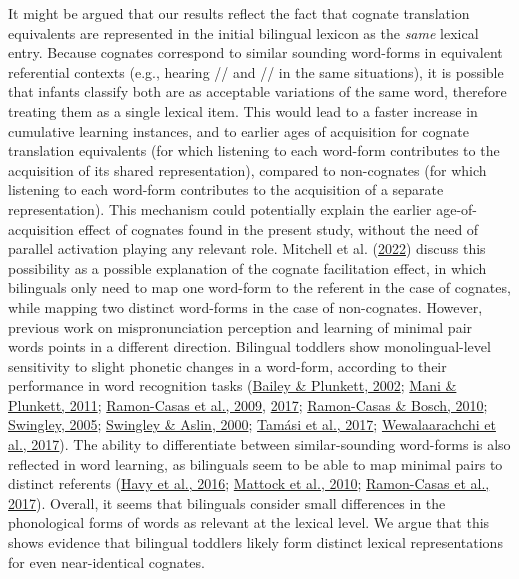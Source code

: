 \documentclass[
]{article}
\begin{document}
It might be argued that our results reflect the fact that cognate
translation equivalents are represented in the initial bilingual lexicon
as the \emph{same} lexical entry. Because cognates correspond to similar
sounding word-forms in equivalent referential contexts (e.g., hearing
// and // in the same situations), it is
possible that infants classify both are as acceptable variations of the
same word, therefore treating them as a single lexical item. This would
lead to a faster increase in cumulative learning instances, and to
earlier ages of acquisition for cognate translation equivalents (for
which listening to each word-form contributes to the acquisition of its
shared representation), compared to non-cognates (for which listening to
each word-form contributes to the acquisition of a separate
representation). This mechanism could potentially explain the earlier
age-of-acquisition effect of cognates found in the present study,
without the need of parallel activation playing any relevant role.
Mitchell et al. (\protect\hyperlink{ref-mitchell2022cognates}{2022})
discuss this possibility as a possible explanation of the cognate
facilitation effect, in which bilinguals only need to map one word-form
to the referent in the case of cognates, while mapping two distinct
word-forms in the case of non-cognates. However, previous work on
mispronunciation perception and learning of minimal pair words points in
a different direction. Bilingual toddlers show monolingual-level
sensitivity to slight phonetic changes in a word-form, according to
their performance in word recognition tasks
(\protect\hyperlink{ref-bailey2002phonological}{Bailey \& Plunkett,
2002}; \protect\hyperlink{ref-mani2011does}{Mani \& Plunkett, 2011};
\protect\hyperlink{ref-ramon-casas2009vowel}{Ramon-Casas et al., 2009},
\protect\hyperlink{ref-ramon-casas2017minimalpair}{2017};
\protect\hyperlink{ref-ramon-casas2010are}{Ramon-Casas \& Bosch, 2010};
\protect\hyperlink{ref-swingley200511montholds}{Swingley, 2005};
\protect\hyperlink{ref-swingley2000spoken}{Swingley \& Aslin, 2000};
\protect\hyperlink{ref-tamasi2017pupillometry}{Tamási et al., 2017};
\protect\hyperlink{ref-wewalaarachchi2017vowels}{Wewalaarachchi et al.,
2017}). The ability to differentiate between similar-sounding word-forms
is also reflected in word learning, as bilinguals seem to be able to map
minimal pairs to distinct referents
(\protect\hyperlink{ref-havy2016phonetic}{Havy et al., 2016};
\protect\hyperlink{ref-mattock2010first}{Mattock et al., 2010};
\protect\hyperlink{ref-ramon-casas2017minimalpair}{Ramon-Casas et al.,
2017}). Overall, it seems that bilinguals consider small differences in
the phonological forms of words as relevant at the lexical level. We
argue that this shows evidence that bilingual toddlers likely form
distinct lexical representations for even near-identical cognates.
\end{document}
